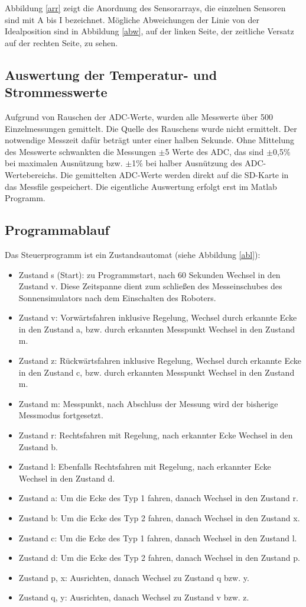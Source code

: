 \documentclass[a4paper,bibtotoc,oneside]{scrbook}
\begin{document}
Abbildung \ref{arr} zeigt die Anordnung des Sensorarrays, die einzelnen Sensoren sind mit A bis I bezeichnet. Mögliche Abweichungen der Linie von der Idealposition sind in Abbildung \ref{abw}, auf der linken Seite, der zeitliche Versatz auf der rechten Seite, zu sehen.

\subsection{Auswertung der Temperatur- und Strommesswerte}\thispagestyle{empty}
Aufgrund von Rauschen der ADC-Werte, wurden alle Messwerte über 500 Einzelmessungen gemittelt. Die Quelle des Rauschens wurde nicht ermittelt. Der notwendige Messzeit dafür beträgt unter einer halben Sekunde. Ohne Mittelung des Messwerte schwankten die Messungen $\pm$5 Werte des ADC, das sind $\pm$0,5$\%$ bei maximalen Ausnützung bzw. $\pm$1$\%$ bei halber Ausnützung des ADC-Wertebereichs. Die gemittelten ADC-Werte werden direkt auf die SD-Karte in das Messfile gespeichert. Die eigentliche Auswertung erfolgt erst im Matlab Programm.
 
\subsection{Programmablauf}\thispagestyle{empty}

Das Steuerprogramm ist ein Zustandsautomat (siehe Abbildung \ref{abl}):
\begin{itemize}
\item Zustand s (Start): zu Programmstart, nach 60 Sekunden Wechsel in den Zustand v. Diese Zeitspanne dient zum schließen des Messeinschubes des Sonnensimulators nach dem Einschalten des Roboters.
\item Zustand v: Vorwärtsfahren inklusive Regelung, Wechsel durch erkannte Ecke in den Zustand a, bzw. durch erkannten Messpunkt Wechsel in den Zustand m.
\item Zustand z: Rückwärtsfahren inklusive Regelung, Wechsel durch erkannte Ecke in den Zustand c, bzw. durch erkannten Messpunkt Wechsel in den Zustand m.
\item Zustand m: Messpunkt, nach Abschluss der Messung wird der bisherige Messmodus fortgesetzt.
\item Zustand r: Rechtsfahren mit Regelung, nach erkannter Ecke Wechsel in den Zustand b.
\item Zustand l: Ebenfalls Rechtsfahren mit Regelung, nach erkannter Ecke Wechsel in den Zustand d.
\item Zustand a: Um die Ecke des Typ 1 fahren, danach Wechsel in den Zustand r. 
\item Zustand b: Um die Ecke des Typ 2 fahren, danach Wechsel in den Zustand x.
\item Zustand c: Um die Ecke des Typ 1 fahren, danach Wechsel in den Zustand l. 
\item Zustand d: Um die Ecke des Typ 2 fahren, danach Wechsel in den Zustand p.
\item Zustand p, x: Ausrichten, danach Wechsel zu Zustand q bzw. y.
\item Zustand q, y: Ausrichten, danach Wechsel zu Zustand v bzw. z.
\end{itemize}
\end{document}
